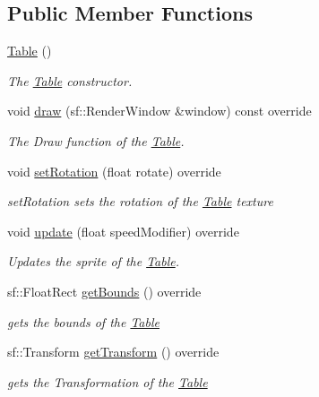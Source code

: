 \subsection*{Public Member Functions}
\begin{DoxyCompactItemize}
\item 
\hyperlink{class_table_a049f2e06391781ae255c6698869c4ad1}{Table} ()
\begin{DoxyCompactList}\small\item\em The \hyperlink{class_table}{Table} constructor. \end{DoxyCompactList}\item 
void \hyperlink{class_table_af11162bb18173237925aef067ab07e87}{draw} (sf\+::\+Render\+Window \&window) const override
\begin{DoxyCompactList}\small\item\em The Draw function of the \hyperlink{class_table}{Table}. \end{DoxyCompactList}\item 
void \hyperlink{class_table_ae331c0377b28ee3c21b3d70b969841e2}{set\+Rotation} (float rotate) override
\begin{DoxyCompactList}\small\item\em set\+Rotation sets the rotation of the \hyperlink{class_table}{Table} texture \end{DoxyCompactList}\item 
void \hyperlink{class_table_af37e903447fa51718b7ad49dd2d4dbc3}{update} (float speed\+Modifier) override
\begin{DoxyCompactList}\small\item\em Updates the sprite of the \hyperlink{class_table}{Table}. \end{DoxyCompactList}\item 
sf\+::\+Float\+Rect \hyperlink{class_table_a4b3e8a7218a1095cf3ab7da58fb7f977}{get\+Bounds} () override
\begin{DoxyCompactList}\small\item\em gets the bounds of the \hyperlink{class_table}{Table} \end{DoxyCompactList}\item 
sf\+::\+Transform \hyperlink{class_table_afdc573e44d9de924c991eaa36efb6c56}{get\+Transform} () override
\begin{DoxyCompactList}\small\item\em gets the Transformation of the \hyperlink{class_table}{Table} \end{DoxyCompactList}\end{DoxyCompactItemize}
